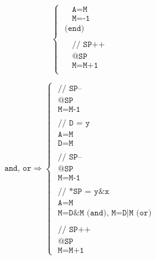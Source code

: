 \documentclass[a4paper]{book}
\begin{document}
\[\begin{cases}
        ~ ~ ~ ~\texttt{ A=M                                 } \\
        ~ ~ ~ ~\texttt{ M=-1                                } \\
        \texttt{ (end)                                      } \\
        \\
        ~ ~ ~ ~\texttt{ // SP++                             } \\
        ~ ~ ~ ~\texttt{ @SP                                 } \\
        ~ ~ ~ ~\texttt{ M=M+1                               } \\
    \end{cases}
\]

\[
    \texttt{and, or}
    \Rightarrow
    \begin{cases}
        \texttt{ // SP--                  } \\
        \texttt{ @SP                      } \\
        \texttt{ M=M-1                    } \\
        \\
        \texttt{ // D = y                 } \\
        \texttt{ A=M                      } \\
        \texttt{ D=M                      } \\
        \\
        \texttt{ // SP--                  } \\
        \texttt{ @SP                      } \\
        \texttt{ M=M-1                    } \\
        \\
        \texttt{ // *SP = y\&x            } \\
        \texttt{ A=M                      } \\
        \texttt{ M=D\&M (and), M=D|M (or) } \\
        \\
        \texttt{ // SP++                  } \\
        \texttt{ @SP                      } \\
        \texttt{ M=M+1                    }
    \end{cases}
\]
\end{document}
